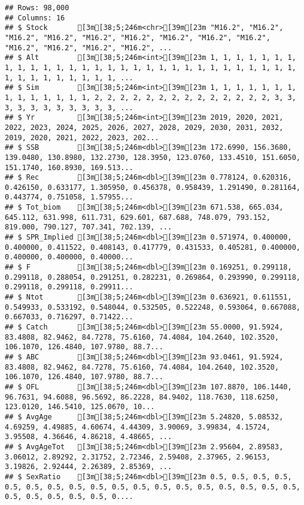 \documentclass[]{article}
\begin{document}
\begin{verbatim}
## Rows: 98,000
## Columns: 16
## $ Stock       [3m[38;5;246m<chr>[39m[23m "M16.2", "M16.2", "M16.2", "M16.2", "M16.2", "M16.2", "M16.2", "M16.2", "M16.2", "M16.2", "M16.2", "M16.2", "M16.2", ...
## $ Alt         [3m[38;5;246m<int>[39m[23m 1, 1, 1, 1, 1, 1, 1, 1, 1, 1, 1, 1, 1, 1, 1, 1, 1, 1, 1, 1, 1, 1, 1, 1, 1, 1, 1, 1, 1, 1, 1, 1, 1, 1, 1, 1, 1, 1, 1, ...
## $ Sim         [3m[38;5;246m<int>[39m[23m 1, 1, 1, 1, 1, 1, 1, 1, 1, 1, 1, 1, 1, 1, 2, 2, 2, 2, 2, 2, 2, 2, 2, 2, 2, 2, 2, 2, 3, 3, 3, 3, 3, 3, 3, 3, 3, 3, 3, ...
## $ Yr          [3m[38;5;246m<int>[39m[23m 2019, 2020, 2021, 2022, 2023, 2024, 2025, 2026, 2027, 2028, 2029, 2030, 2031, 2032, 2019, 2020, 2021, 2022, 2023, 202...
## $ SSB         [3m[38;5;246m<dbl>[39m[23m 172.6990, 156.3680, 139.0480, 130.8980, 132.2730, 128.3950, 123.0760, 133.4510, 151.6050, 151.1740, 160.8930, 169.513...
## $ Rec         [3m[38;5;246m<dbl>[39m[23m 0.778124, 0.620316, 0.426150, 0.633177, 1.305950, 0.456378, 0.958439, 1.291490, 0.281164, 0.443774, 0.751058, 1.57955...
## $ Tot_biom    [3m[38;5;246m<dbl>[39m[23m 671.538, 665.034, 645.112, 631.998, 611.731, 629.601, 687.688, 748.079, 793.152, 819.000, 790.127, 707.341, 702.139, ...
## $ SPR_Implied [3m[38;5;246m<dbl>[39m[23m 0.571974, 0.400000, 0.400000, 0.411522, 0.408143, 0.417779, 0.431533, 0.405281, 0.400000, 0.400000, 0.400000, 0.40000...
## $ F           [3m[38;5;246m<dbl>[39m[23m 0.169251, 0.299118, 0.299118, 0.288054, 0.291251, 0.282231, 0.269864, 0.293990, 0.299118, 0.299118, 0.299118, 0.29911...
## $ Ntot        [3m[38;5;246m<dbl>[39m[23m 0.636921, 0.611551, 0.549933, 0.533192, 0.548044, 0.532505, 0.522248, 0.593064, 0.667088, 0.667033, 0.716297, 0.71422...
## $ Catch       [3m[38;5;246m<dbl>[39m[23m 55.0000, 91.5924, 83.4808, 82.9462, 84.7278, 75.6160, 74.4084, 104.2640, 102.3520, 106.1070, 126.4840, 107.9780, 88.7...
## $ ABC         [3m[38;5;246m<dbl>[39m[23m 93.0461, 91.5924, 83.4808, 82.9462, 84.7278, 75.6160, 74.4084, 104.2640, 102.3520, 106.1070, 126.4840, 107.9780, 88.7...
## $ OFL         [3m[38;5;246m<dbl>[39m[23m 107.8870, 106.1440, 96.7631, 94.6088, 96.5692, 86.2228, 84.9402, 118.7630, 118.6250, 123.0120, 146.5410, 125.0670, 10...
## $ AvgAge      [3m[38;5;246m<dbl>[39m[23m 5.24820, 5.08532, 4.69259, 4.49885, 4.60674, 4.44309, 3.90069, 3.99834, 4.15724, 3.95508, 4.36646, 4.86218, 4.48665, ...
## $ AvgAgeTot   [3m[38;5;246m<dbl>[39m[23m 2.95604, 2.89583, 3.06012, 2.89292, 2.31752, 2.72346, 2.59408, 2.37965, 2.96153, 3.19826, 2.92444, 2.26389, 2.85369, ...
## $ SexRatio    [3m[38;5;246m<dbl>[39m[23m 0.5, 0.5, 0.5, 0.5, 0.5, 0.5, 0.5, 0.5, 0.5, 0.5, 0.5, 0.5, 0.5, 0.5, 0.5, 0.5, 0.5, 0.5, 0.5, 0.5, 0.5, 0.5, 0.5, 0....
\end{verbatim}
\end{document}
